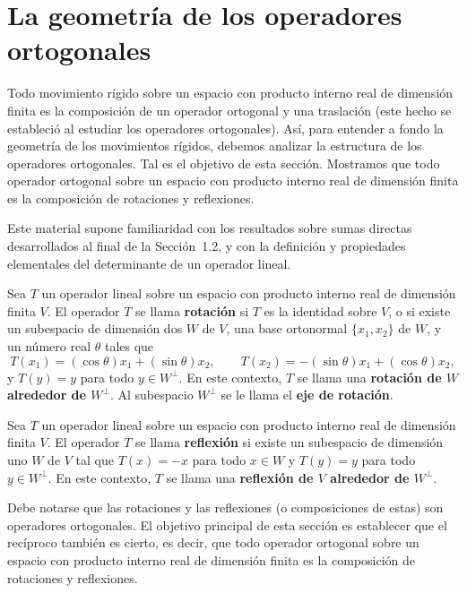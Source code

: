 \section{La geometría de los operadores ortogonales}

Todo movimiento rígido sobre un espacio con producto interno real de dimensión finita es la composición de un operador ortogonal y una traslación (este hecho se estableció al estudiar los operadores ortogonales). Así, para entender a fondo la geometría de los movimientos rígidos, debemos analizar la estructura de los operadores ortogonales. Tal es el objetivo de esta sección. Mostramos que todo operador ortogonal sobre un espacio con producto interno real de dimensión finita es la composición de rotaciones y reflexiones.

Este material supone familiaridad con los resultados sobre sumas directas desarrollados al final de la Sección~1.2, y con la definición y propiedades elementales del determinante de un operador lineal.

\begin{definicion}[Rotación]
    Sea $T$ un operador lineal sobre un espacio con producto interno real de dimensión finita $V$. El operador $T$ se llama \textbf{rotación} si $T$ es la identidad sobre $V$, o si existe un subespacio de dimensión dos $W$ de $V$, una base ortonormal $\{x_1,x_2\}$ de $W$, y un número real $\theta$ tales que
    \begin{equation*}
        T(x_1)=(\cos\theta)x_1+(\sin\theta)x_2, \qquad T(x_2)=-(\sin\theta)x_1+(\cos\theta)x_2,
    \end{equation*}
    y $T(y)=y$ para todo $y\in W^\perp$. En este contexto, $T$ se llama una \textbf{rotación de $W$ alrededor de $W^\perp$}. Al subespacio $W^\perp$ se le llama el \textbf{eje de rotación}.
\end{definicion}

\begin{definicion}[Reflexión]
    Sea $T$ un operador lineal sobre un espacio con producto interno real de dimensión finita $V$. El operador $T$ se llama \textbf{reflexión} si existe un subespacio de dimensión uno $W$ de $V$ tal que $T(x)=-x$ para todo $x\in W$ y $T(y)=y$ para todo $y\in W^\perp$. En este contexto, $T$ se llama una \textbf{reflexión de $V$ alrededor de $W^\perp$}.
\end{definicion}

Debe notarse que las rotaciones y las reflexiones (o composiciones de estas) son operadores ortogonales. El objetivo principal de esta sección es establecer que el recíproco también es cierto, es decir, que todo operador ortogonal sobre un espacio con producto interno real de dimensión finita es la composición de rotaciones y reflexiones.

